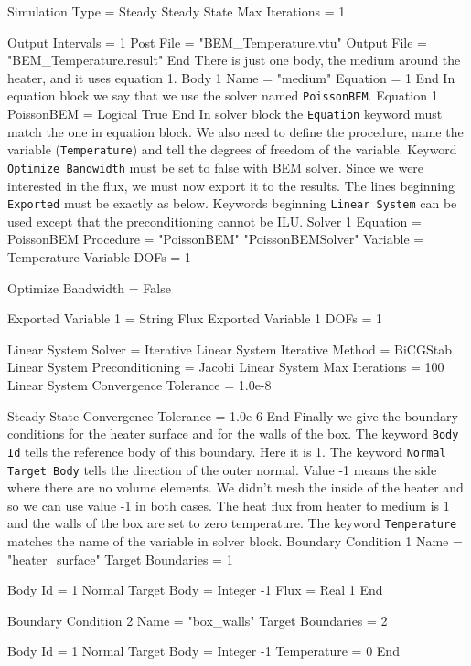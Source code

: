  Simulation Type = Steady
  Steady State Max Iterations = 1

  Output Intervals = 1
  Post File = "BEM_Temperature.vtu"
  Output File = "BEM_Temperature.result"
End
\ttend
There is just one body, the medium around the heater, and it uses equation 1.
\ttbegin
Body 1
  Name = "medium"
  Equation = 1
End
\ttend
In equation block we say that we use the solver named {\tt PoissonBEM}.
\ttbegin
Equation 1
  PoissonBEM = Logical True
End
\ttend
In solver block the {\tt Equation} keyword must match the one in equation block.
We also need to define the procedure, name the variable ({\tt Temperature}) and tell 
the degrees of freedom of the variable. Keyword {\tt Optimize Bandwidth} must be set to false
with BEM solver. Since we were interested in the flux, we must now export it to the
results. The lines beginning {\tt Exported} must be exactly as below. Keywords beginning
{\tt Linear System} can be used except that the preconditioning cannot be ILU.
\ttbegin
Solver 1
  Equation = PoissonBEM
  Procedure = "PoissonBEM" "PoissonBEMSolver"
  Variable = Temperature
  Variable DOFs = 1

  Optimize Bandwidth = False

  Exported Variable 1 = String Flux
  Exported Variable 1 DOFs = 1

  Linear System Solver = Iterative
  Linear System Iterative Method = BiCGStab
  Linear System Preconditioning = Jacobi
  Linear System Max Iterations = 100
  Linear System Convergence Tolerance = 1.0e-8

  Steady State Convergence Tolerance = 1.0e-6
End
\ttend
Finally we give the boundary conditions for the heater surface and for the walls of the 
box. The keyword {\tt Body Id} tells the reference body of this boundary. Here it is 1. 
The keyword {\tt Normal Target Body} tells the direction of the outer normal. Value -1 
means the side where there are no volume elements. We didn't mesh the inside of 
the heater and so we can use value -1 in both cases. The heat flux from heater to
medium is 1 and the walls of the box are set to zero temperature. The keyword
{\tt Temperature} matches the name of the variable in solver block.
\ttbegin
Boundary Condition 1
  Name = "heater_surface"
  Target Boundaries = 1

  Body Id = 1
  Normal Target Body = Integer -1
  Flux = Real 1
End

Boundary Condition 2
  Name = "box_walls"
  Target Boundaries = 2

  Body Id = 1
  Normal Target Body = Integer -1
  Temperature = 0
End
\ttend
